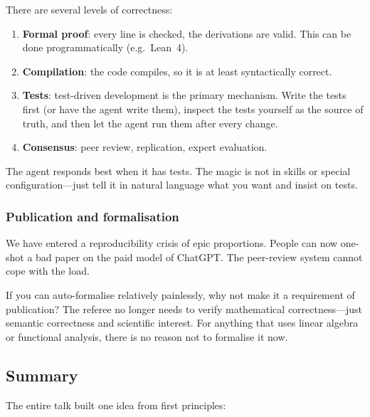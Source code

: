\begin{audience}
  There are several levels of correctness:
  \begin{enumerate}[(1)]
    \item \textbf{Formal proof}: every line is checked, the derivations
      are valid.  This can be done programmatically (e.g.\ Lean~4).
    \item \textbf{Compilation}: the code compiles, so it is at least
      syntactically correct.
    \item \textbf{Tests}: test-driven development is the primary
      mechanism.  Write the tests first (or have the agent write them),
      inspect the tests yourself as the source of truth, and then let
      the agent run them after every change.
    \item \textbf{Consensus}: peer review, replication, expert
      evaluation.
  \end{enumerate}
  The agent responds best when it has tests.  The magic is not in skills
  or special configuration---just tell it in natural language what you
  want and insist on tests.
\end{audience}

\subsubsection{Publication and formalisation}

\begin{audience}
  We have entered a reproducibility crisis of epic proportions.  People
  can now one-shot a bad paper on the paid model of ChatGPT\@.  The
  peer-review system cannot cope with the load.

  If you can auto-formalise relatively painlessly, why not make it a
  requirement of publication?  The referee no longer needs to verify
  mathematical correctness---just semantic correctness and scientific
  interest.  For anything that uses linear algebra or functional
  analysis, there is no reason not to formalise it now.
\end{audience}

\subsection{Summary}

The entire talk built one idea from first principles:

